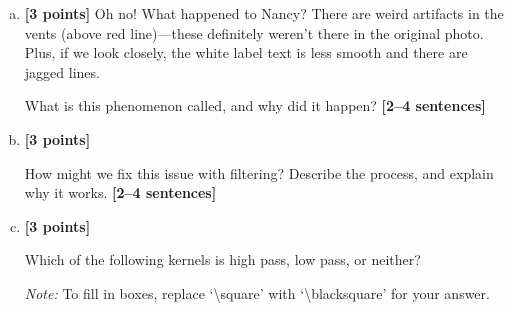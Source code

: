 \documentclass[11pt]{article}
\begin{document}
\begin{enumerate}[(a)]
\item \textbf{[3 points]} Oh no! What happened to Nancy? There are weird artifacts in the vents (above red line)---these definitely weren't there in the original photo. Plus, if we look closely, the white label text is less smooth and there are jagged lines.
    
    \begin{tcolorbox}[colback=orange!5!white,colframe=orange!75!black]
    What is this phenomenon called, and why did it happen? \textbf{[2--4 sentences]}
    \end{tcolorbox}

    \item \textbf{[3 points]}
    \begin{tcolorbox}[colback=orange!5!white,colframe=orange!75!black]
    How might we fix this issue with filtering? Describe the process, and explain why it works. \textbf{[2--4 sentences]}
    \end{tcolorbox}

\item \textbf{[3 points]}
\begin{tcolorbox}[colback=orange!5!white,colframe=orange!75!black]
Which of the following kernels is high pass, low pass, or neither?
\end{tcolorbox}

\emph{Note:} To fill in boxes, replace `\textbackslash square' with `\textbackslash blacksquare' for your answer.


\end{enumerate}
\end{document}
